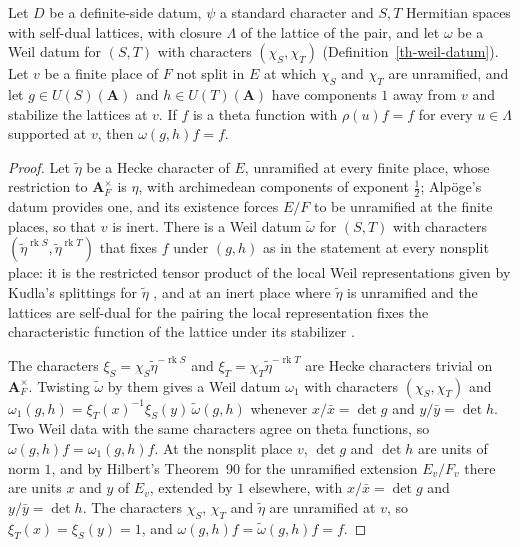 \begin{lemma}\label{th-nonsplit-vacua}
Let $D$ be a definite-side datum, $\psi$ a standard character and $S,T$
Hermitian spaces with self-dual lattices, with closure $\Lambda$ of the lattice
of the pair, and let $\omega$ be a Weil datum for $(S,T)$ with characters
$(\chi_S,\chi_T)$ (Definition~\ref{th-weil-datum}). Let $v$ be a finite place of
$F$ not split in $E$ at which $\chi_S$ and $\chi_T$ are unramified, and let
$g\in U(S)(\mathbf A)$ and $h\in U(T)(\mathbf A)$ have components $1$ away from
$v$ and stabilize the lattices at $v$. If $f$ is a theta function with
$\rho(u)f=f$ for every $u\in\Lambda$ supported at $v$, then $\omega(g,h)f=f$.
\end{lemma}
\begin{proof}
Let $\tilde\eta$ be a Hecke character of $E$, unramified at every finite place,
whose restriction to $\mathbf A_F^\times$ is $\eta$, with archimedean components
of exponent $\frac12$; Alpöge's datum provides one, and its existence forces
$E/F$ to be unramified at the finite places, so that $v$ is inert. There is a
Weil datum
$\tilde\omega$ for $(S,T)$ with characters $(\tilde\eta^{\operatorname{rk}S},\tilde\eta^{\operatorname{rk}T})$
that fixes $f$ under $(g,h)$ as in the statement at every nonsplit place: it is
the restricted tensor product of the local Weil representations given by
Kudla's splittings for $\tilde\eta$ \cite{Kud94}, and at an inert place where
$\tilde\eta$ is unramified and the lattices are self-dual for the pairing the
local representation fixes the characteristic function of the lattice under its
stabilizer \cite{Kud94}.

The characters $\xi_S=\chi_S\tilde\eta^{-\operatorname{rk}S}$ and
$\xi_T=\chi_T\tilde\eta^{-\operatorname{rk}T}$ are Hecke characters trivial on
$\mathbf A_F^\times$. Twisting $\tilde\omega$ by them gives a Weil datum
$\omega_1$ with characters $(\chi_S,\chi_T)$ and
$\omega_1(g,h)=\xi_T(x)^{-1}\xi_S(y)\,\tilde\omega(g,h)$ whenever $x/\bar x=\det g$
and $y/\bar y=\det h$. Two Weil data with the same characters agree on theta
functions, so $\omega(g,h)f=\omega_1(g,h)f$. At the nonsplit place $v$, $\det g$
and $\det h$ are units of norm $1$, and by Hilbert's Theorem~90 for the
unramified extension $E_v/F_v$ there are units $x$ and $y$ of $E_v$, extended
by $1$ elsewhere, with $x/\bar x=\det g$ and
$y/\bar y=\det h$. The characters $\chi_S$, $\chi_T$ and $\tilde\eta$ are
unramified at $v$, so $\xi_T(x)=\xi_S(y)=1$, and
$\omega(g,h)f=\tilde\omega(g,h)f=f$.
\end{proof}

